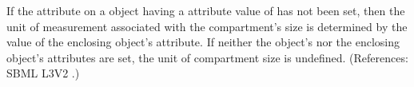 If the attribute  on a \Compartment object having a
 attribute value of  has not been set, then
the unit of measurement associated with the compartment's size is
determined by the value of the enclosing \Model object's
 attribute.  If neither the \Compartment object's
 nor the enclosing \Model object's 
attributes are set, the unit of compartment size is undefined.
(References: SBML L3V2 .)
